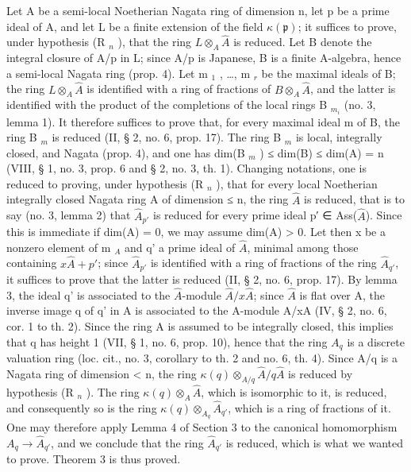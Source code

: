 Let A be a semi-local Noetherian Nagata ring of dimension n, let p be a prime ideal of A, and let L be a finite extension of the field \(\kappa(\mathfrak{p})\); it suffices to prove, under hypothesis (R \(_{n}\) ), that the ring \(L \otimes_{A} \hat{A}\) is reduced. Let B denote the integral closure of A/p in L; since A/p is Japanese, B is a finite A-algebra, hence a semi-local Nagata ring (prop. 4). Let m \(_{1}\) , \ldots, m \(_{r}\) be the maximal ideals of B; the ring \(L \otimes_{A} \hat{A}\) is identified with a ring of fractions of \(B \otimes_{A} \hat{A}\), and the latter is identified with the product of the completions of the local rings B \(_{m_{i}}\) (no. 3, lemma 1). It therefore suffices to prove that, for every maximal ideal m of B, the ring B \(_{m}\) is reduced (II, § 2, no. 6, prop. 17). The ring B \(_{m}\) is local, integrally closed, and Nagata (prop. 4), and one has dim(B \(_{m}\) ) ≤ dim(B) ≤ dim(A) = n (VIII, § 1, no. 3, prop. 6 and § 2, no. 3, th. 1). Changing notations, one is reduced to proving, under hypothesis (R \(_{n}\) ), that for every local Noetherian integrally closed Nagata ring A of dimension ≤ n, the ring \(\hat{A}\) is reduced, that is to say (no. 3, lemma 2) that \(\hat{A}_{p'}\) is reduced for every prime ideal p′ ∈ Ass(\(\hat{A}\)). Since this is immediate if dim(A) = 0, we may assume dim(A) > 0. Let then x be a nonzero element of m \(_{A}\) and q' a prime ideal of \(\hat{A}\), minimal among those containing \(x\hat{A} + p'\); since \(\hat{A}_{p'}\) is identified with a ring of fractions of the ring \(\hat{A}_{q'}\), it suffices to prove that the latter is reduced (II, § 2, no. 6, prop. 17). By lemma 3, the ideal q' is associated to the \(\hat{A}\)-module \(\hat{A}/x\hat{A}\); since \(\hat{A}\) is flat over A, the inverse image q of q' in A is associated to the A-module A/xA (IV, § 2, no. 6, cor. 1 to th. 2). Since the ring A is assumed to be integrally closed, this implies that q has height 1 (VII, § 1, no. 6, prop. 10), hence that the ring \(A_{q}\) is a discrete valuation ring (loc. cit., no. 3, corollary to th. 2 and no. 6, th. 4). Since A/q is a Nagata ring of dimension < n, the ring \(\kappa(q) \otimes_{A/q} \hat{A}/q\hat{A}\) is reduced by hypothesis (R \(_{n}\) ). The ring \(\kappa(q) \otimes_{A} \hat{A}\), which is isomorphic to it, is reduced, and consequently so is the ring \(\kappa(q) \otimes_{A_{q}} \hat{A}_{q'}\), which is a ring of fractions of it. One may therefore apply Lemma 4 of Section 3 to the canonical homomorphism \(A_{q} \to \hat{A}_{q'}\), and we conclude that the ring \(\hat{A}_{q'}\) is reduced, which is what we wanted to prove. Theorem 3 is thus proved.

